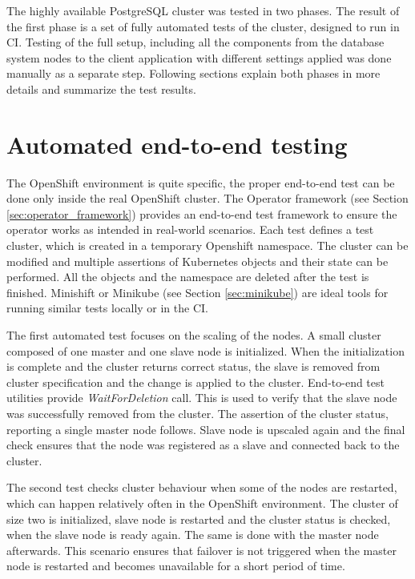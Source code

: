 \documentclass[
  digital, %
  twoside, %
  table,   %
  lof,     %
  lot,     %
]{fithesis3}
\begin{document}
The highly available PostgreSQL cluster was tested in two phases. The result of the first phase is a set of fully automated tests of the cluster, designed to run in CI. Testing of the full setup, including all the components from the database system nodes to the client application with different settings applied was done manually as a separate step. Following sections explain both phases in more details and summarize the test results.

\section{Automated end-to-end testing}
The OpenShift environment is quite specific, the proper end-to-end test can be done only inside the real OpenShift cluster. The Operator framework (see Section \ref{sec:operator_framework}) provides an end-to-end test framework to ensure the operator works as intended in real-world scenarios. Each test defines a test cluster, which is created in a temporary Openshift namespace. The cluster can be modified and multiple assertions of Kubernetes objects and their state can be performed. All the objects and the namespace are deleted after the test is finished. Minishift or Minikube (see Section \ref{sec:minikube}) are ideal tools for running similar tests locally or in the CI.

The first automated test focuses on the scaling of the nodes. A small cluster composed of one master and one slave node is initialized. When the initialization is complete and the cluster returns correct status, the slave is removed from cluster specification and the change is applied to the cluster. End-to-end test utilities provide \textit{WaitForDeletion} call. This is used to verify that the slave node was successfully removed from the cluster. The assertion of the cluster status, reporting a single master node follows.  Slave node is upscaled again and the final check ensures that the node was registered as a slave and connected back to the cluster.

The second test checks cluster behaviour when some of the nodes are restarted, which can happen relatively often in the OpenShift environment. The cluster of size two is initialized, slave node is restarted and the cluster status is checked, when the slave node is ready again. The same is done with the master node afterwards. This scenario ensures that failover is not triggered when the master node is restarted and becomes unavailable for a short period of time.
\end{document}
